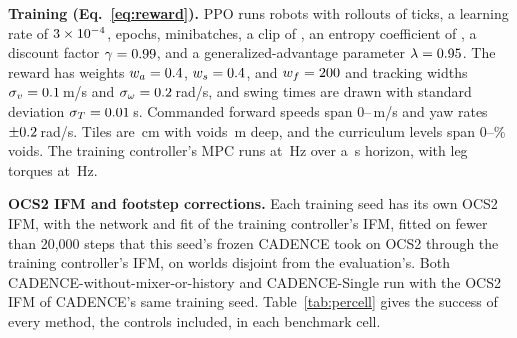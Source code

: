 \noindent\textbf{Training (Eq.~\eqref{eq:reward}).}
 PPO runs \corlParallelEnvs{} robots with rollouts of
\corlRolloutSteps{} ticks, a learning rate of $3 \times 10^{-4}$,
\corlPpoEpochs{} epochs, \corlMiniBatches{} minibatches, a clip of
\corlClip, an entropy coefficient of \corlEntropyCoef, a discount factor $\gamma = 0.99$, and a generalized-advantage parameter $\lambda = 0.95$. The reward has weights $w_a =
0.4$, $w_s = 0.4$, and $w_f =
200$ and tracking widths $\sigma_v =
0.1$\,m/s and $\sigma_\omega = 0.2$\,rad/s,
and swing times are drawn with standard deviation $\sigma_T =
0.01$\,s. Commanded forward speeds span
0--\corlCmdVxMax\,m/s and yaw rates $\pm0.2$\,rad/s. Tiles
are \corlTerrainCellCm\,cm with voids \corlVoidDepth\,m deep, and the
\corlNumLevels{} curriculum levels span 0--\corlMaxVoidPct\% voids. The
training controller's MPC runs at \corlMpcHz\,Hz over a
\corlMpcHorizon\,s horizon, with leg torques at \corlPhysicsHz\,Hz.

\noindent\textbf{OCS2 IFM and footstep corrections.}
 Each training seed has its own OCS2 IFM, with the network
and fit of the training controller's IFM, fitted on fewer than 20{,}000 steps that this seed's frozen CADENCE
took on OCS2 through the training controller's IFM, on worlds disjoint
from the evaluation's. Both CADENCE-without-mixer-or-history and CADENCE-Single run
with the OCS2 IFM of CADENCE's same training seed. Table~\ref{tab:percell} gives the success of every
method, the controls included, in each benchmark cell.

